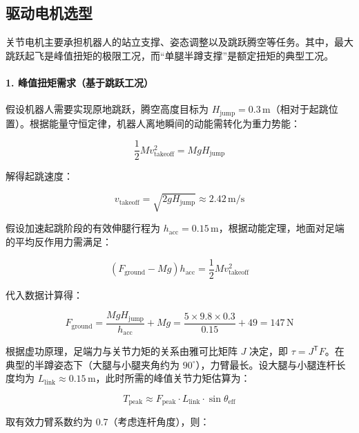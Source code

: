 \subsection{驱动电机选型}

关节电机主要承担机器人的站立支撑、姿态调整以及跳跃腾空等任务。其中，最大跳跃起飞是峰值扭矩的极限工况，而“单腿半蹲支撑”是额定扭矩的典型工况。

\paragraph{1. 峰值扭矩需求（基于跳跃工况）}
假设机器人需要实现原地跳跃，腾空高度目标为 $H_{\text{jump}} = 0.3\,\mathrm{m}$（相对于起跳位置）。根据能量守恒定律，机器人离地瞬间的动能需转化为重力势能：

\begin{equation}
  \frac{1}{2} M v_{\text{takeoff}}^2 = M g H_{\text{jump}}
\end{equation}

解得起跳速度：

\begin{equation}
  v_{\text{takeoff}} = \sqrt{2 g H_{\text{jump}}} \approx 2.42\,\mathrm{m/s}
\end{equation}

假设加速起跳阶段的有效伸腿行程为 $h_{\text{acc}} = 0.15\,\mathrm{m}$，根据动能定理，地面对足端的平均反作用力需满足：

\begin{equation}
  \left(F_{\text{ground}} - Mg\right) h_{\text{acc}} = \frac{1}{2} M v_{\text{takeoff}}^2
\end{equation}

代入数据计算得：

\begin{equation}
  F_{\text{ground}} = \frac{M g H_{\text{jump}}}{h_{\text{acc}}} + Mg
  = \frac{5 \times 9.8 \times 0.3}{0.15} + 49 = 147\,\mathrm{N}
\end{equation}

根据虚功原理，足端力与关节力矩的关系由雅可比矩阵 $J$ 决定，即 $\tau = J^\mathsf{T} F$。在典型的半蹲姿态下（大腿与小腿夹角约为 $90^\circ$），力臂最长。设大腿与小腿连杆长度均为 $L_{\text{link}} \approx 0.15\,\mathrm{m}$，此时所需的峰值关节力矩估算为：

\begin{equation}
  T_{\text{peak}} \approx F_{\text{peak}} \cdot L_{\text{link}} \cdot \sin \theta_{\text{eff}}
\end{equation}

取有效力臂系数约为 0.7（考虑连杆角度），则：

